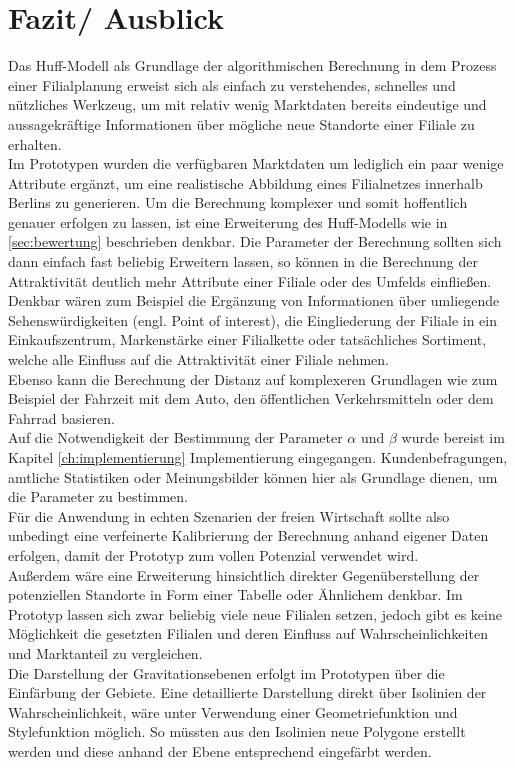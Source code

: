 \section{Fazit/ Ausblick}
Das Huff-Modell als Grundlage der algorithmischen Berechnung in dem Prozess einer Filialplanung erweist sich als einfach zu verstehendes, schnelles und nützliches Werkzeug, um mit relativ wenig Marktdaten bereits eindeutige und aussagekräftige Informationen über mögliche neue Standorte einer Filiale zu erhalten.\\
Im Prototypen wurden die verfügbaren Marktdaten um lediglich ein paar wenige Attribute ergänzt, um eine realistische Abbildung eines Filialnetzes innerhalb Berlins zu generieren. 
Um die Berechnung komplexer und somit hoffentlich genauer erfolgen zu lassen, ist eine Erweiterung des Huff-Modells wie in \ref{sec:bewertung} beschrieben denkbar.
Die Parameter der Berechnung sollten sich dann einfach fast beliebig Erweitern lassen, so können in die Berechnung der Attraktivität deutlich mehr Attribute einer Filiale oder des Umfelds einfließen.
Denkbar wären zum Beispiel die Ergänzung von Informationen über umliegende Sehenswürdigkeiten (engl. Point of interest), die Eingliederung der Filiale in ein Einkaufszentrum, Markenstärke einer Filialkette oder tatsächliches Sortiment, welche alle Einfluss auf die Attraktivität einer Filiale nehmen.\\
Ebenso kann die Berechnung der Distanz auf komplexeren Grundlagen wie zum Beispiel der Fahrzeit mit dem Auto, den öffentlichen Verkehrsmitteln oder dem Fahrrad basieren.\\
Auf die Notwendigkeit der Bestimmung der Parameter $\alpha$ und $\beta$ wurde bereist im Kapitel \ref{ch:implementierung} Implementierung eingegangen.
Kundenbefragungen, amtliche Statistiken oder Meinungsbilder können hier als Grundlage dienen, um die Parameter zu bestimmen.\\
Für die Anwendung in echten Szenarien der freien Wirtschaft sollte also unbedingt eine verfeinerte Kalibrierung der Berechnung anhand eigener Daten erfolgen, damit der Prototyp zum vollen Potenzial verwendet wird.\\
Außerdem wäre eine Erweiterung hinsichtlich direkter Gegenüberstellung der potenziellen Standorte in Form einer Tabelle oder Ähnlichem denkbar.
Im Prototyp lassen sich zwar beliebig viele neue Filialen setzen, jedoch gibt es keine Möglichkeit die gesetzten Filialen und deren Einfluss auf Wahrscheinlichkeiten und Marktanteil zu vergleichen.\\
Die Darstellung der Gravitationsebenen erfolgt im Prototypen über die Einfärbung der Gebiete.
Eine detaillierte Darstellung direkt über Isolinien der Wahrscheinlichkeit, wäre unter Verwendung einer Geometriefunktion und Stylefunktion möglich. 
So müssten aus den Isolinien neue Polygone erstellt werden und diese anhand der Ebene entsprechend eingefärbt werden.

